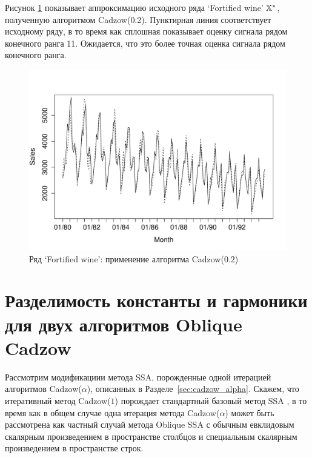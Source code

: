 \documentclass[12pt, specialist, subf,href,colorlinks=true,substylefile = spbu.rtx]{disser}
\theoremstyle{remark}
\theoremstyle{definition}
\begin{document}
Рисунок \ref{fig:rl} показывает аппроксимацию исходного ряда `Fortified wine' $\mathbb{X}^*$, полученную алгоритмом Cadzow($0.2$). 
Пунктирная линия соответствует исходному ряду, в то время как сплошная показывает оценку сигнала рядом конечного ранга 11.
Ожидается, что это более точная оценка сигнала рядом конечного ранга.

\begin{figure}[!hhh]
	\includegraphics[width = \columnwidth]{rlimage.pdf}
	\caption{Ряд `Fortified wine': применение алгоритма Cadzow($0.2$)}
	\label{fig:rl}
\end{figure}




\appendix 
\chapter{Разделимость константы и гармоники для двух алгоритмов Oblique Cadzow}
\label{sec:app}

Рассмотрим модификациии метода SSA, порожденные одной итерацией алгоритмов Cadzow($\alpha$), описанных в Разделе~\ref{sec:cadzow_alpha}. Скажем, что итеративный метод Cadzow($1$) порождает стандартный базовый метод SSA \cite{Golyandina.etal2001,Golyandina.Zhigljavsky2012}, в то время как в общем случае одна итерация метода Cadzow($\alpha$) может быть рассмотрена как частный случай метода Oblique SSA \cite{Golyandina2013} с обычным евклидовым скалярным произведением в пространстве столбцов и специальным скалярным произведением в пространстве строк.
\end{document}
